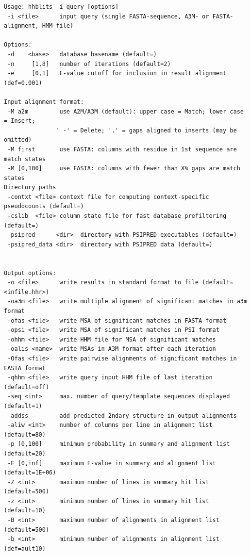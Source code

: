 \documentclass[11pt,a4paper]{article}
\begin{document}
\small 
\begin{verbatim}
Usage: hhblits -i query [options] 
 -i <file>      input query (single FASTA-sequence, A3M- or FASTA-alignment, HMM-file)

Options:                                                                       
 -d    <base>   database basename (default=)                                 
 -n     [1,8]   number of iterations (default=2)                              
 -e     [0,1]   E-value cutoff for inclusion in result alignment (def=0.001)      

Input alignment format:                                                       
 -M a2m         use A2M/A3M (default): upper case = Match; lower case = Insert;
               ' -' = Delete; '.' = gaps aligned to inserts (may be omitted)   
 -M first       use FASTA: columns with residue in 1st sequence are match states
 -M [0,100]     use FASTA: columns with fewer than X% gaps are match states   
Directory paths 
 -contxt <file> context file for computing context-specific pseudocounts (default=)
 -cslib  <file> column state file for fast database prefiltering (default=)
 -psipred      <dir>  directory with PSIPRED executables (default=)  
 -psipred_data <dir>  directory with PSIPRED data (default=) 


Output options: 
 -o <file>      write results in standard format to file (default=<infile.hhr>)
 -oa3m <file>   write multiple alignment of significant matches in a3m format
 -ofas <file>   write MSA of significant matches in FASTA format
 -opsi <file>   write MSA of significant matches in PSI format
 -ohhm <file>   write HHM file for MSA of significant matches
 -oalis <name>  write MSAs in A3M format after each iteration
 -Ofas <file>   write pairwise alignments of significant matches in FASTA format
 -qhhm <file>   write query input HHM file of last iteration (default=off)      
 -seq <int>     max. number of query/template sequences displayed (default=1)  
 -addss         add predicted 2ndary structure in output alignments             
 -aliw <int>    number of columns per line in alignment list (default=80)       
 -p [0,100]     minimum probability in summary and alignment list (default=20)  
 -E [0,inf[     maximum E-value in summary and alignment list (default=1E+06)      
 -Z <int>       maximum number of lines in summary hit list (default=500)        
 -z <int>       minimum number of lines in summary hit list (default=10)        
 -B <int>       maximum number of alignments in alignment list (default=500)     
 -b <int>       minimum number of alignments in alignment list (def=ault10)     


\end{verbatim}
\end{document}
